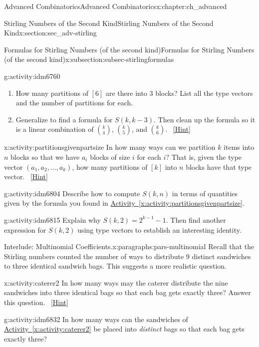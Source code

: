 \documentclass[oneside,10pt,]{book}
\numberwithin{equation}{chapter}
\begin{document}
\begin{chapterptx}{Advanced Combinatorics}{}{Advanced Combinatorics}{}{}{x:chapter:ch_advanced}
\begin{sectionptx}{Stirling Numbers of the Second Kind}{}{Stirling Numbers of the Second Kind}{}{}{x:section:sec_adv-stirling}
\begin{subsectionptx}{Formulas for Stirling Numbers (of the second kind)}{}{Formulas for Stirling Numbers (of the second kind)}{}{}{x:subsection:subsec-stirlingformulas}
\begin{activity}{}{g:activity:idm6760}%
\begin{enumerate}[font=\bfseries,label=(\alph*),ref=\alph*]
\item{}How many partitions of \([6]\) are there into 3 blocks?  List all the type vectors and the number of partitions for each.%
\item{}Generalize to find a formula for \(S(k,k-3)\).  Then clean up the formula so it is a linear combination of \(\binom{k}{4}\), \(\binom{k}{5}\), and \(\binom{k}{6}\).%
\qquad~\hfill{\tiny\hyperlink{g:hint:idm6772-back}{[Hint]}}\end{enumerate}
\end{activity}
\begin{activity}{}{x:activity:partitionsgivenpartsize}%
In how many ways can we partition \(k\) items into \(n\) blocks so that we have \(a_i\) blocks of size \(i\) for each \(i\)? That is, given the type vector \((a_1, a_2, \ldots, a_k)\), how many partitions of \([k]\) into \(n\) blocks have that type vector.%
\qquad~\hfill{\tiny\hyperlink{g:hint:idm6786-back}{[Hint]}}\end{activity}
\begin{activity}{}{g:activity:idm6804}%
Describe how to compute \(S(k,n)\) in terms of quantities given by the formula you found in \hyperref[x:activity:partitionsgivenpartsize]{Activity~\ref{x:activity:partitionsgivenpartsize}}.%
\end{activity}
\begin{activity}{}{g:activity:idm6815}%
Explain why \(S(k, 2) = 2^{k-1} - 1\).  Then find another expression for \(S(k,2)\) using type vectors to establish an interesting identity.%
\end{activity}
\begin{paragraphs}{Interlude: Multinomial Coefficients.}{x:paragraphs:pars-multinomial}%
Recall that the Stirling numbers counted the number of ways to distribute 9 distinct sandwiches to three identical sandwich bags.  This suggests a more realistic question.%
\begin{activity}{}{x:activity:caterer2}%
In how many ways may the caterer distribute the nine sandwiches into three identical bags so that each bag gets exactly three? Answer this question.%
\qquad~\hfill{\tiny\hyperlink{g:hint:idm6826-back}{[Hint]}}\end{activity}
\begin{activity}{}{g:activity:idm6832}%
In how many ways can the sandwiches of \hyperref[x:activity:caterer2]{Activity~\ref{x:activity:caterer2}} be placed into \emph{distinct} bags so that each bag gets exactly three?%

\end{activity}
\end{paragraphs}
\end{subsectionptx}
\end{sectionptx}
\end{chapterptx}
\end{document}
